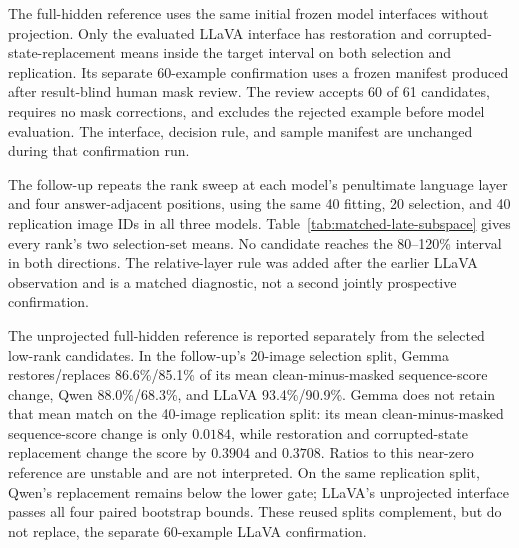 The full-hidden reference uses the same initial frozen model interfaces without projection. Only the evaluated LLaVA interface has restoration and corrupted-state-replacement means inside the target interval on both selection and replication. Its separate 60-example confirmation uses a frozen manifest produced after result-blind human mask review. The review accepts 60 of 61 candidates, requires no mask corrections, and excludes the rejected example before model evaluation. The interface, decision rule, and sample manifest are unchanged during that confirmation run.

The follow-up repeats the rank sweep at each model's penultimate language layer and four answer-adjacent positions, using the same 40 fitting, 20 selection, and 40 replication image IDs in all three models. Table~\ref{tab:matched-late-subspace} gives every rank's two selection-set means. No candidate reaches the 80--120\% interval in both directions. The relative-layer rule was added after the earlier LLaVA observation and is a matched diagnostic, not a second jointly prospective confirmation.



The unprojected full-hidden reference is reported separately from the selected low-rank candidates. In the follow-up's 20-image selection split, Gemma restores/replaces 86.6\%/85.1\% of its mean clean-minus-masked sequence-score change, Qwen 88.0\%/68.3\%, and LLaVA 93.4\%/90.9\%. Gemma does not retain that mean match on the 40-image replication split: its mean clean-minus-masked sequence-score change is only $0.0184$, while restoration and corrupted-state replacement change the score by $0.3904$ and $0.3708$. Ratios to this near-zero reference are unstable and are not interpreted. On the same replication split, Qwen's replacement remains below the lower gate; LLaVA's unprojected interface passes all four paired bootstrap bounds. These reused splits complement, but do not replace, the separate 60-example LLaVA confirmation.
